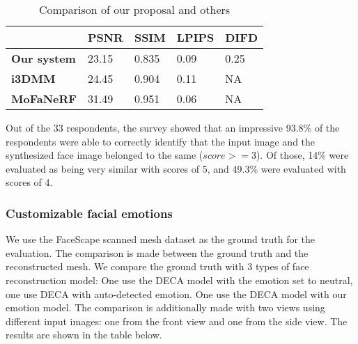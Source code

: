 \begin{table}[H]
    \centering
    \captionsetup{font=bf}
    \caption{Comparison of our proposal and others}
    \begin{tabularx}{\linewidth}{| X | X | X | X | X |}
        \hline
                            & \textbf{PSNR} & \textbf{SSIM} & \textbf{LPIPS} & \textbf{DIFD} \\ \hline\hline
        \textbf{Our system} & 23.15         & 0.835         & 0.09           & 0.25          \\ \hline %
        \textbf{i3DMM}      & 24.45         & 0.904         & 0.11           & NA            \\ \hline
        \textbf{MoFaNeRF}   & 31.49         & 0.951         & 0.06           & NA            \\ \hline
    \end{tabularx}
    \label{loss_stats}
\end{table}

Out of the 33 respondents, the survey showed that an impressive 93.8\% of the respondents were able to correctly identify that the input image and the synthesized face image belonged to the same  ($score >= 3$). Of those, 14\% were evaluated as being very similar with scores of 5, and 49.3\% were evaluated with scores of 4. %


\subsubsection{Customizable facial emotions}

We use the FaceScape scanned mesh dataset as the ground truth for the evaluation. The comparison is made between the ground truth and the reconstructed mesh. We compare the ground truth with 3 types of face reconstruction model: One use the DECA model with the emotion set to neutral, one use DECA with auto-detected emotion. One use the DECA model with our emotion model. The comparison is additionally made with two views using different input images: one from the front view and one from the side view. The results are shown in the table below.

